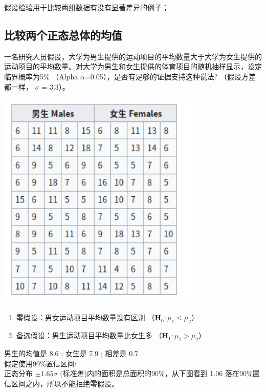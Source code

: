 假设检验用于比较两组数据有没有显著差异的例子；

\hypertarget{ux6bd4ux8f83ux4e24ux4e2aux6b63ux6001ux603bux4f53ux7684ux5747ux503c}{%
\subsection{比较两个正态总体的均值}\label{ux6bd4ux8f83ux4e24ux4e2aux6b63ux6001ux603bux4f53ux7684ux5747ux503c}}

一名研究人员假设，大学为男生提供的运动项目的平均数量大于大学为女生提供的运动项目的平均数量。对大学为男生和女生提供的体育项目的随机抽样显示，设定临界概率为5\%
（Alpha \(\alpha\)=0.05），是否有足够的证据支持这种说法? （假设方差都一样，
\(\sigma\) = 3.3）。


\includegraphics[width=10cm]{Screenshotfrom2022-12-2822-35-57.png}


\begin{enumerate}
\tightlist
\item
  零假设：男女运动项目平均数量没有区别
  （\(\mathbf{H}_0: {\mu}_1 \le  {\mu}_2\)）
\item
  备选假设：男生运动项目平均数量比女生多
  （\(\mathbf{H}_1: {\mu}_1 > {\mu}_2\)）
\end{enumerate}

男生的均值是 8.6 ; 女生是 7.9 ; 相差是 0.7\\
假定使用90\%置信区间:\\
正态分布 \(\pm 1.65{\sigma}\) (标准差)内的面积是总面积的90\%，从下图看到
1.06 落在90\%置信区间之内，所以不能拒绝零假设。

